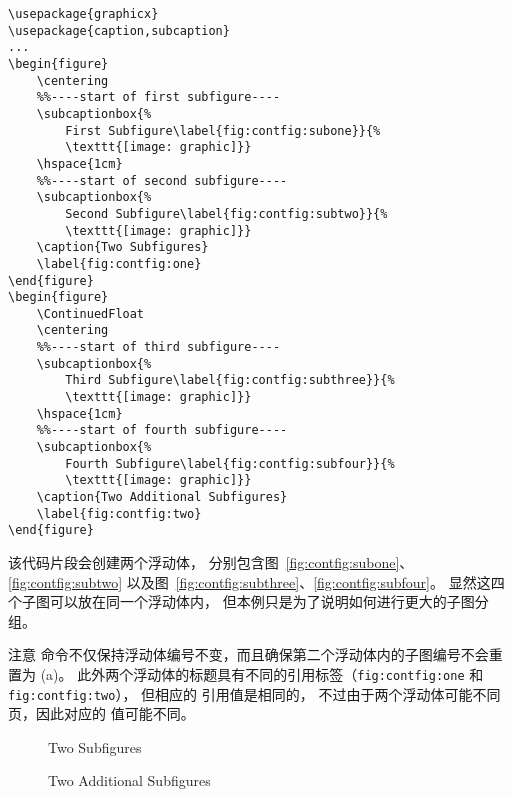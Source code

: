\begin{lstlisting}
\usepackage{graphicx}
\usepackage{caption,subcaption}
...
\begin{figure}
	\centering
	%%----start of first subfigure----
	\subcaptionbox{%
		First Subfigure\label{fig:contfig:subone}}{%
		\texttt{[image: graphic]}}
	\hspace{1cm}
	%%----start of second subfigure----
	\subcaptionbox{%
		Second Subfigure\label{fig:contfig:subtwo}}{%
		\texttt{[image: graphic]}}
	\caption{Two Subfigures}
	\label{fig:contfig:one}
\end{figure}
\begin{figure}
	\ContinuedFloat
	\centering
	%%----start of third subfigure----
	\subcaptionbox{%
		Third Subfigure\label{fig:contfig:subthree}}{%
		\texttt{[image: graphic]}}
	\hspace{1cm}
	%%----start of fourth subfigure----
	\subcaptionbox{%
		Fourth Subfigure\label{fig:contfig:subfour}}{%
		\texttt{[image: graphic]}}
	\caption{Two Additional Subfigures}
	\label{fig:contfig:two}
\end{figure}
\end{lstlisting}
该代码片段会创建两个浮动体，
分别包含图~\ref{fig:contfig:subone}、\ref{fig:contfig:subtwo} 
以及图~\ref{fig:contfig:subthree}、\ref{fig:contfig:subfour}。
显然这四个子图可以放在同一个浮动体内，
但本例只是为了说明如何进行更大的子图分组。

注意  命令不仅保持浮动体编号不变，而且确保第二个浮动体内的子图编号不会重置为 (a)。
此外两个浮动体的标题具有不同的引用标签（\texttt{fig:contfig:one} 和 \texttt{fig:contfig:two}），
但相应的  引用值是相同的，
不过由于两个浮动体可能不同页，因此对应的  值可能不同。

\begin{figure}
	\centering
	\hspace{1cm}
	\caption{Two Subfigures}
	\label{fig:contfig:one}
\end{figure}
\begin{figure}
	\ContinuedFloat
	\centering
	\hspace{1cm}
	\caption{Two Additional Subfigures}
	\label{fig:contfig:two}
\end{figure}

\endinput

